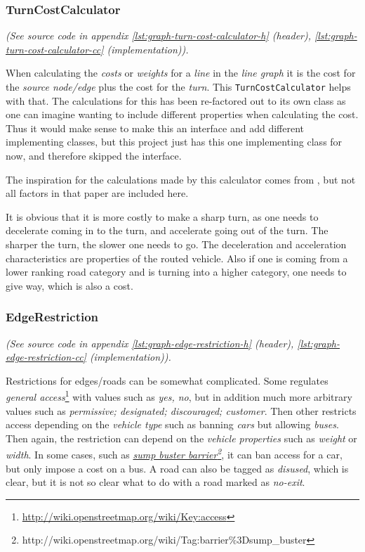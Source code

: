 \documentclass[../main.tex]{subfiles}
\begin{document}
\subsubsection{TurnCostCalculator}
\textit{(See source code in appendix \ref{lst:graph-turn-cost-calculator-h} (header), \ref{lst:graph-turn-cost-calculator-cc} (implementation)).}

\noindent
When calculating the \textit{costs} or \textit{weights} for a \textit{line} in the \textit{line graph} it is the cost for the \textit{source node/edge} plus the cost for the \textit{turn}. This \texttt{TurnCostCalculator} helps with that. The calculations for this has been re-factored out to its own class as one can imagine wanting to include different properties when calculating the cost. Thus it would make sense to make this an interface and add different implementing classes, but this project just has this one implementing class for now, and therefore skipped the interface.

The inspiration for the calculations made by this calculator comes from \cite{volker-turncost}, but not all factors in that paper are included here.

It is obvious that it is more costly to make a sharp turn, as one needs to decelerate coming in to the turn, and accelerate going out of the turn. The sharper the turn, the slower one needs to go. The deceleration and acceleration characteristics are properties of the routed vehicle.  Also if one is coming from a lower ranking road category and is turning into a higher category, one needs to give way, which is also a cost.

\subsubsection{EdgeRestriction}\label{sect:edge-restriction}
\textit{(See source code in appendix \ref{lst:graph-edge-restriction-h} (header), \ref{lst:graph-edge-restriction-cc} (implementation)).}

\noindent
Restrictions for edges/roads can be somewhat complicated. Some regulates \textit{general access}\footnote{\url{http://wiki.openstreetmap.org/wiki/Key:access}} with values such as \textit{yes, no}, but in addition much more arbitrary values such as \textit{permissive; designated; discouraged; customer}. Then other restricts access depending on the \textit{vehicle type} such as banning \textit{cars} but allowing \textit{buses}. Then again, the restriction can depend on the \textit{vehicle properties} such as \textit{weight} or \textit{width}. In some cases, such as \href{http://wiki.openstreetmap.org/wiki/Tag:barrier\%3Dsump_buster}{\textit{sump buster barrier\footnote{\url{http://wiki.openstreetmap.org/wiki/Tag:barrier\%3Dsump_buster}}}}, it can ban access for a car, but only impose a cost on a bus. A road can also be tagged as \textit{disused}, which is clear, but it is not so clear what to do with a road marked as \textit{no-exit}.
\end{document}
